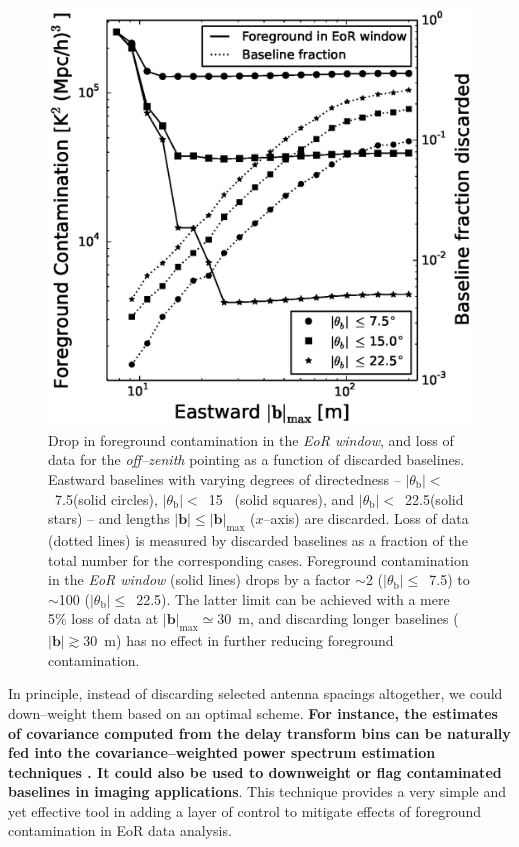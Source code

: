 \documentclass[preprint2,iop,numberedappendix]{emulateapj}
\begin{document}
\begin{figure}[htb]
\centering
\includegraphics[width=\linewidth]{fig14.eps}
\caption{Drop in foreground contamination in the {\it EoR window}, and loss of data for the {\it off--zenith} pointing as a function of discarded baselines. Eastward baselines with varying degrees of directedness -- $|\theta_\textrm{b}|<$~7.5\arcdeg (solid circles), $|\theta_\textrm{b}|<$~15\arcdeg~ (solid squares), and $|\theta_\textrm{b}|<$~22.5\arcdeg (solid stars) -- and lengths $|\boldsymbol{b}| \le |\boldsymbol{b}|_\textrm{max}$ ($x$--axis) are discarded. Loss of data (dotted lines) is measured by discarded baselines as a fraction of the total number for the corresponding cases. Foreground contamination in the {\it EoR window} (solid lines) drops by a factor $\sim$2 ($|\theta_\textrm{b}|\le$~7.5\arcdeg) to $\sim$100 ($|\theta_\textrm{b}|\le$~22.5\arcdeg). The latter limit can be achieved with a mere 5\% loss of data at $|\boldsymbol{b}|_\textrm{max}\simeq30$~m, and discarding longer baselines ($|\boldsymbol{b}|\gtrsim 30$~m) has no effect in further reducing foreground contamination. \label{fig:screening}}
\end{figure}

In principle, instead of discarding selected antenna spacings altogether, we could down--weight them based on an optimal scheme. {\bf For instance, the estimates of covariance computed from the delay transform bins can be naturally fed into the covariance--weighted power spectrum estimation techniques \citep{liu14a,liu14b}. It could also be used to downweight or flag contaminated baselines in imaging applications}. This technique provides a very simple and yet effective tool in adding a layer of control to mitigate effects of foreground contamination in EoR data analysis. 
\end{document}
